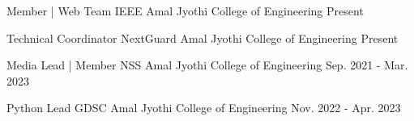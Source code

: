 
\begin{cventries}
  \cventry
    {Member | Web Team} %
    {IEEE} %
    {Amal Jyothi College of Engineering}
    {Present} %
    {}
\end{cventries}
\vspace{-1\baselineskip}
\begin{cventries}
  \cventry
    {Technical Coordinator} %
    {NextGuard} %
    {Amal Jyothi College of Engineering}
    {Present} %
    {}
\end{cventries}
\vspace{-1\baselineskip}
\begin{cventries}
  \cventry
    {Media Lead | Member} %
    {NSS} %
    {Amal Jyothi College of Engineering}
    {Sep. 2021 - Mar. 2023} %
    {}
\end{cventries}
\vspace{-1\baselineskip}
\begin{cventries}
  \cventry
    {Python Lead} %
    {GDSC} %
    {Amal Jyothi College of Engineering}
    {Nov. 2022 - Apr. 2023} %
    {}
\end{cventries}